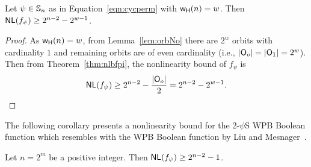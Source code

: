 \documentclass{llncs}
\begin{document}
\begin{theorem}\label{thm:nlboundf}
Let $\psi \in \mathbb{S}_n$ as in Equation~\ref{eqn:cycperm} with $\mathsf{w_H}(n) = w$.
Then $\mathsf{NL}(f_\psi) \ge 2^{n-2} - 2^{w-1}$.
\end{theorem}
\begin{proof}
As $\mathsf{w_H}(n) = w$, from Lemma~\ref{lem:orbNo} there are $2^w$ orbits with cardinality $1$ and remaining orbits are of even cardinality (i.e., $|\mathsf{O}_o| = |\mathsf{O}_1| = 2^w$).
Then from Theorem~\ref{thm:nlbfpi}, the nonlinearity bound of $f_\psi$ is
$$\mathsf{NL}(f_\psi) \ge 2^{n-2} - \frac{|\mathsf{O}_o|}{2} = 2^{n-2} - 2^{w-1}.$$
\end{proof}
The following corollary presents a nonlinearity bound for the 2-$\psi$S WPB Boolean function which resembles with the WPB Boolean function by Liu and Mesnager~\cite{DCC:LiuMes19}.
\begin{corollary}\label{cor:nlbwpb}
Let $n = 2^m$ be a positive integer. Then $\mathsf{NL}(f_\psi) \ge 2^{n-2} - 1$.
\end{corollary}
\end{document}
